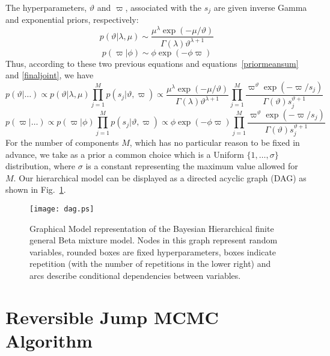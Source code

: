 \documentclass[journal,10pt]{elsart}
\begin{document}
The hyperparameters, $\vartheta$ and $\varpi$, associated with the $s_{j}$ are given inverse Gamma and exponential priors, respectively:
\begin{equation}\label{priorprior1}
p(\vartheta|\lambda,\mu) \sim \frac{\mu^\lambda\exp(-\mu/
\vartheta)}{\Gamma(\lambda)\vartheta^{\lambda+1}}
\end{equation}
\begin{equation}\label{priorprior}
p(\varpi|\phi) \sim \phi \exp(-\phi\varpi)
\end{equation}
Thus, according to these two previous equations and equations~\ref{priormeansum} and \ref{finaljoint}, we have
\begin{equation}\label{posteriorvartheta}
p(\vartheta|\ldots)\propto p(\vartheta|\lambda,\mu)\prod_{j=1}^M p(s_j|\vartheta,\varpi)\propto \frac{\mu^\lambda\exp(-\mu/
\vartheta)}{\Gamma(\lambda)\vartheta^{\lambda+1}} \prod_{j=1}^M \frac{\varpi^\vartheta\exp(-\varpi/
s_j)}{\Gamma(\vartheta)s_j^{\vartheta+1}}
\end{equation}
\begin{equation}\label{posteriorvarpi}
p(\varpi|\ldots)\propto p(\varpi|\phi)\prod_{j=1}^M p(s_j|\vartheta,\varpi)\propto \phi \exp(-\phi\varpi) \prod_{j=1}^M \frac{\varpi^\vartheta\exp(-\varpi/
s_j)}{\Gamma(\vartheta)s_j^{\vartheta+1}}
\end{equation}
For the number of components $M$, which has no particular reason to be fixed in advance, we take as a prior a common choice which is a Uniform $\{1,\ldots,\sigma\}$ distribution, where $\sigma$ is a constant representing the maximum value allowed for $M$.
Our hierarchical model can be displayed as a directed acyclic graph (DAG) as shown in Fig.~\ref{hierarchy}.
\begin{figure}[!ht]
\begin{center}
\texttt{[image: dag.ps]}
\caption{Graphical Model representation of the Bayesian Hierarchical finite general Beta mixture model. Nodes in this graph represent random variables, rounded boxes are fixed hyperparameters, boxes indicate repetition (with the number of repetitions in the lower right) and arcs describe conditional dependencies between variables.
\label{hierarchy}}
\end{center}
\end{figure}
\section{Reversible Jump MCMC Algorithm}
\end{document}
